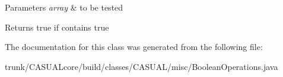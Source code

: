 \begin{DoxyParams}{Parameters}
{\em array} & to be tested \\
\hline
\end{DoxyParams}
\begin{DoxyReturn}{Returns}
true if contains true 
\end{DoxyReturn}


The documentation for this class was generated from the following file\-:\begin{DoxyCompactItemize}
\item 
trunk/\-C\-A\-S\-U\-A\-Lcore/build/classes/\-C\-A\-S\-U\-A\-L/misc/Boolean\-Operations.\-java\end{DoxyCompactItemize}
